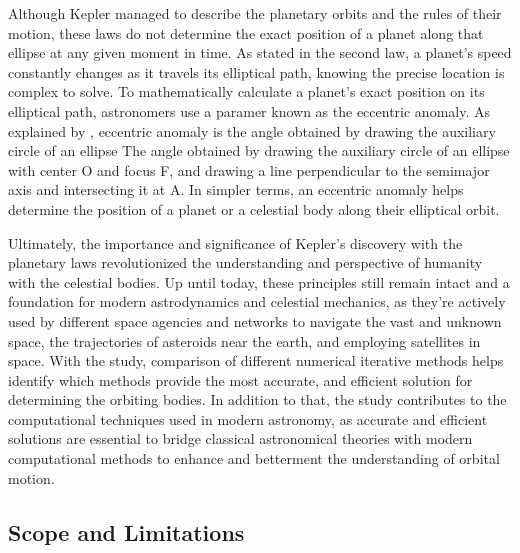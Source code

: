 \documentclass[a4paper,11pt]{article}
\begin{document}
Although Kepler managed to describe the planetary orbits and the rules of their motion, these laws do not determine the exact position of a planet along that ellipse at any given moment in time. As stated in the second law, a planet's speed constantly changes as it travels its elliptical path, knowing the precise location is complex to solve. To mathematically calculate a planet's exact position on its elliptical path, astronomers use a paramer known as the eccentric anomaly. As explained by \textcite{weisstein2026eccentric}, eccentric anomaly is the angle obtained by drawing the auxiliary circle of an ellipse The angle obtained by drawing the auxiliary circle of an ellipse with center O and focus F, and drawing a line perpendicular to the semimajor axis and intersecting it at A. In simpler terms, an eccentric anomaly helps determine the position of a planet or a celestial body along their elliptical orbit.

Ultimately, the importance and significance of Kepler's discovery with the planetary laws revolutionized the understanding and perspective of humanity with the celestial bodies. Up until today, these principles still remain intact and a foundation for modern astrodynamics and celestial mechanics, as they're actively used by different space agencies and networks to navigate the vast and unknown space, the trajectories of asteroids near the earth, and employing satellites in space. With the study, comparison of different numerical iterative methods helps identify which methods provide the most accurate, and efficient solution for determining the orbiting bodies. In addition to that, the study contributes to the computational techniques used in modern astronomy, as accurate and efficient solutions are essential to bridge classical astronomical theories with modern computational methods to enhance and betterment the understanding of orbital motion.

\subsection{Scope and Limitations}
\end{document}

